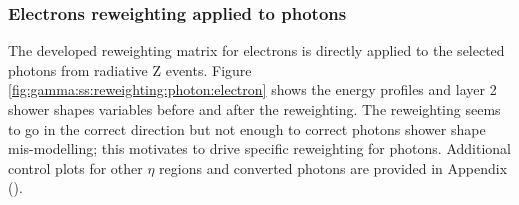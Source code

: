 \subsubsection{Electrons reweighting applied to photons}
The developed reweighting matrix for electrons is directly applied to the selected photons from radiative Z events. Figure \ref{fig:gamma:ss:reweighting:photon:electron} shows the energy profiles and layer 2 shower shapes variables before and after the reweighting. The reweighting seems to go in the correct direction but not enough to correct photons shower shape mis-modelling; this motivates to drive specific reweighting for photons. Additional control plots for other $\eta$ regions and converted photons are provided in Appendix ().
\begin{figure}[ht]
    \centering
	 \\

\end{figure}
